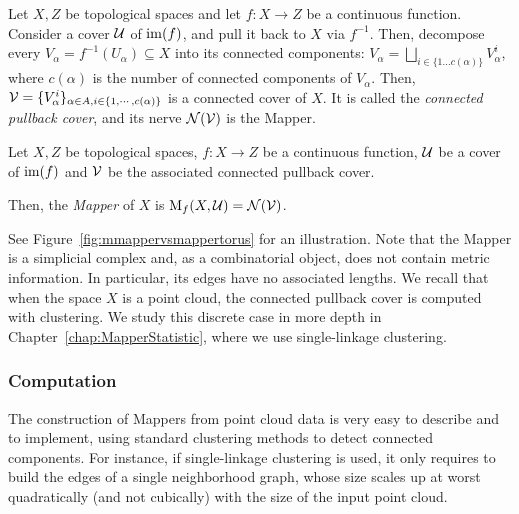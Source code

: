 Let $X,Z$ be topological spaces and let $f:X\rightarrow Z$ be a continuous function. 
Consider a cover $\mathcal{U}$ of $\mathrm{im}(f)$, and pull
it back to $X$ via $f^{-1}$. Then, decompose every
$V_\alpha=f^{-1}(U_\alpha)\subseteq X$ into its connected components:
$V_\alpha=\bigsqcup_{i\in\{1...c(\alpha)\}}V_\alpha^i$, where
$c(\alpha)$ is the number of connected components of $V_\alpha$.  Then,
$\mathcal{V}=\{V_\alpha^i\}_{\alpha\in A,i\in\{1,\cdots,c(\alpha)\}}$ is a connected
cover of $X$.  It is called the {\em connected pullback cover}, and
its nerve ${\mathcal N}(\mathcal{V})$ is the Mapper.

\begin{defin}
Let $X,Z$ be topological spaces, $f:X\rightarrow Z$ be a continuous
function, $\mathcal{U}$ be a cover of $\mathrm{im}(f)$ and $\mathcal{V}$ be the associated
connected pullback cover.  

Then, the \emph{Mapper} of $X$ is
$\mathrm{M}_f(X,\mathcal{U})=\mathcal{N}(\mathcal{V})$.
\end{defin}



See Figure~\ref{fig:mmappervsmappertorus} for an illustration.
Note that the Mapper is a simplicial complex and, as a combinatorial object, does not contain metric information. In particular,
its edges have no associated lengths.
We recall that  when the space $X$ is a point cloud, the connected pullback cover is computed with clustering. %
We study this discrete case in more depth in Chapter~\ref{chap:MapperStatistic}, where we use single-linkage clustering. 



\subsubsection*{Computation}

The construction of Mappers from point cloud data is very easy to describe
and to implement, using standard clustering methods to detect connected
components. For instance, if single-linkage clustering is used, 
it only requires to build the edges of a single neighborhood graph, 
whose size scales up at worst quadratically (and not cubically)
with the size of the input point cloud.


%
